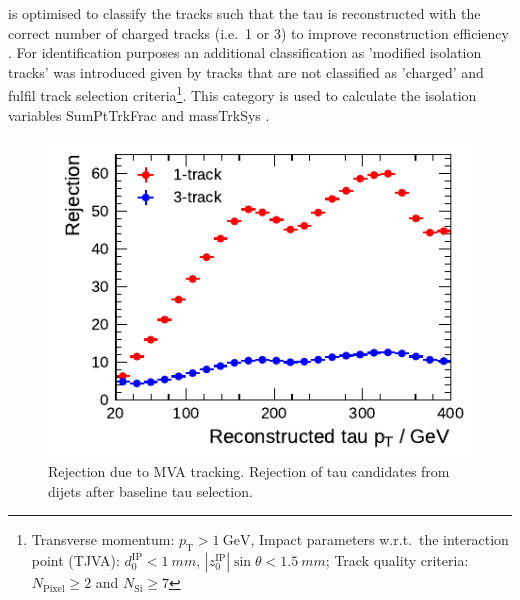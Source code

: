 is optimised to classify the tracks such that the tau is reconstructed with the
correct number of charged tracks (i.e.\ 1 or 3) to improve reconstruction
efficiency . For identification purposes an additional classification as 'modified
isolation tracks' was introduced given by tracks that are not classified as
'charged' and fulfil track selection criteria\footnote{Transverse momentum:
  $p_\mathrm{T} > \SI{1}{\giga\electronvolt}$, Impact parameters w.r.t.\ the
  interaction point (TJVA): $d_0^\text{IP} < \SI{1}{mm}$,
  $|z_0^\text{IP}| \sin\theta < \SI{1.5}{mm}$; Track quality criteria:
  $N_\text{Pixel} \geq 2$ and $N_\text{Si} \geq 7$}. This category is used to
calculate the isolation variables SumPtTrkFrac and massTrkSys .

%
%
%
%
%

\begin{figure}[ht]
  \centering
  \includegraphics{./figures/bdt_perf/mva_tracking_rejection.pdf}
  \caption{Rejection due to MVA tracking. Rejection of tau candidates from
    dijets after baseline tau selection.}
  \label{fig:mva_tracking_rejection}
\end{figure}

